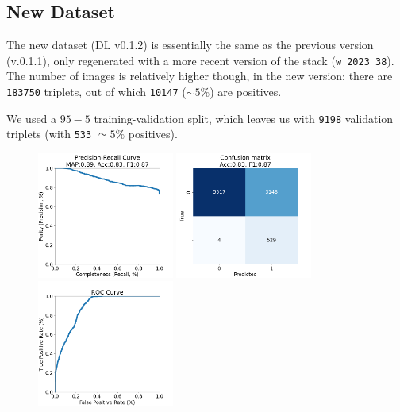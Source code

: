 \documentclass[DM,authoryear,toc]{lsstdoc}
\begin{document}
\clearpage
\subsection{New Dataset}
The new dataset (DL v0.1.2) is essentially the same as the previous version (v.0.1.1), only regenerated with a more recent version of the stack (\texttt{w\_2023\_38}). The number of images is relatively higher though, in the new version: there are \texttt{183750} triplets, out of which \texttt{10147} ($\sim 5\%$) are positives.

We used a $95-5$ training-validation split, which leaves us with \texttt{9198} validation triplets (with \texttt{533} $\simeq 5\%$ positives).


\begin{figure}[h]
  \centering
  \includegraphics[width=0.4\textwidth]{precrec_13-resnet50-FullAugmentation-scratch-B64__0255000__npy_data_0.1.2-0sigma_256by256__posw_20.png}
  \includegraphics[width=0.4\textwidth]{confmat_13-resnet50-FullAugmentation-scratch-B64__0255000__npy_data_0.1.2-0sigma_256by256__posw_20.png}
  \includegraphics[width=0.4\textwidth]{roc_13-resnet50-FullAugmentation-scratch-B64__0255000__npy_data_0.1.2-0sigma_256by256__posw_20.png}

\end{figure}
\end{document}
